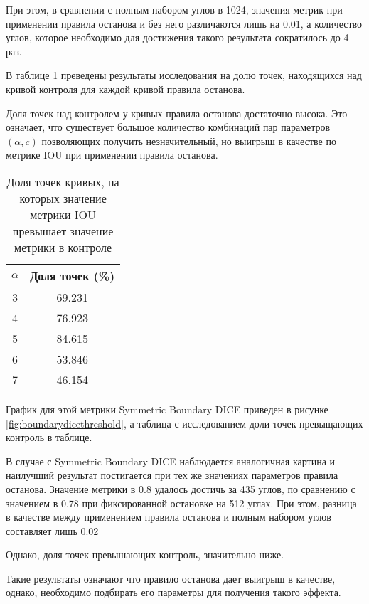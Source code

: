 При этом, в сравнении с полным набором углов в 1024, значения метрик при применении правила останова и без него различаются лишь на 0.01, а количество углов, которое необходимо для достижения такого результата сократилось до 4 раз.

В таблице \ref*{tab:thresholdingiou} преведены результаты исследования на долю точек, находящихся над кривой контроля для каждой кривой правила останова.

Доля точек над контролем у кривых правила останова достаточно высока. Это означает, что существует большое количество комбинаций пар параметров \((\alpha, c)\) позволяющих получить незначительный, но выигрыш в качестве по метрике IOU при применении правила останова. 

\begin{table}[H]
\centering
\caption{Доля точек кривых, на которых значение метрики IOU превышает значение метрики в  контроле}
\label{tab:thresholdingiou}
\begin{tabular}{|c|c|}
\hline
\(\alpha\) & Доля точек (\%) \\
\hline
3 & 69.231 \\
4 & 76.923 \\
5 & 84.615 \\
6 & 53.846 \\
7 & 46.154 \\
\hline
\end{tabular}
\end{table}

График для этой метрики Symmetric Boundary DICE приведен в рисунке \ref*{fig:boundarydicethreshold}, а таблица с исследованием доли точек превыщающих контроль в таблице.


В случае с Symmetric Boundary DICE наблюдается аналогичная картина и наилучший результат постигается при тех же значениях параметров правила останова. Значение метрики в 0.8 удалось достичь за 435 углов, по сравнению с значением в 0.78 при фиксированной остановке на 512 углах. При этом, разница в качестве между применением правила останова и полным набором углов составляет лишь 0.02

Однако, доля точек превышающих контроль, значительно ниже.

Такие результаты означают что правило останова дает выигрыш в качестве, однако, необходимо подбирать его параметры для получения такого эффекта.


